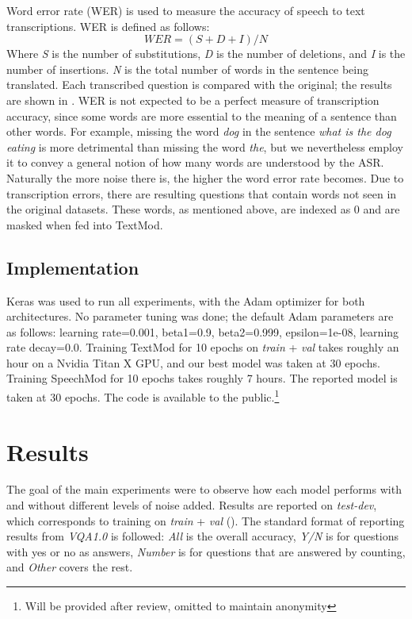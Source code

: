 \documentclass[letterpaper]{article} %
\begin{document}
Word error rate (WER) is used to measure the accuracy of speech to text transcriptions. WER is defined as follows: 
\begin{displaymath}
  \mathit{WER} = (S+D+I)/N
\end{displaymath}
Where \textit{S} is the number of substitutions, \textit{D} is the number of deletions, and \textit{I} is the number of insertions. \textit{N} is the total number of words in the sentence being translated. Each transcribed question is compared with the original; the results are shown in . WER is not expected to be a perfect measure of transcription accuracy, since some words are more essential to the meaning of a sentence than other words. For example, missing the word \emph{dog} in the sentence \emph{what is the dog eating} is more detrimental than missing the word \emph{the}, but we nevertheless employ it to convey a general notion of how many words are understood by the ASR. Naturally the more noise there is, the higher the word error rate becomes. Due to transcription errors, there are resulting questions that contain words not seen in the original datasets. These words, as mentioned above, are indexed as 0 and are masked when fed into TextMod.


\subsection{Implementation}
Keras was used to run all experiments, with the Adam optimizer \cite{kingma2014adam} for both architectures. No parameter tuning was done; the default Adam parameters are as follows: learning rate=0.001, beta1=0.9, beta2=0.999, epsilon=1e-08, learning  rate decay=0.0. Training TextMod for 10 epochs on \textit{train} + \textit{val} takes roughly an hour on a Nvidia Titan X GPU, and our best model was taken at 30 epochs. Training SpeechMod for 10 epochs takes roughly 7 hours. The reported model is taken at 30 epochs. The code is available to the public.\footnote{Will be provided after review, omitted to maintain anonymity}


\section{Results}
The goal of the main experiments were to observe how each model performs with and without different levels of noise added. Results are reported on \textit{test-dev}, which corresponds to training on \textit{train} + \textit{val} (). The standard format of reporting results from \textit{VQA1.0} is followed: \textit{All} is the overall accuracy, \textit{Y/N} is for questions with yes or no as answers, \textit{Number} is for questions that are answered by counting, and \textit{Other} covers the rest.
\end{document}

